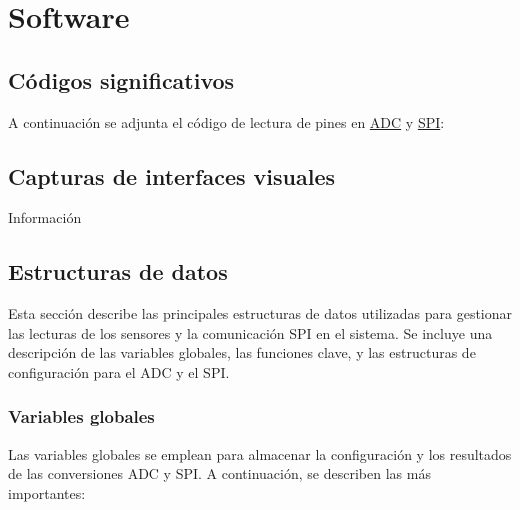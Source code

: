 \chapter{Software}

\section{Códigos significativos}
A continuación se adjunta el código de lectura de pines en \hyperref[adc_code]{ADC} y \hyperref[spi_code]{SPI}:




    
    \section{Capturas de interfaces visuales}
        Información
    
    \section{Estructuras de datos}

Esta sección describe las principales estructuras de datos utilizadas para gestionar las lecturas de los sensores y la comunicación SPI en el sistema. Se incluye una descripción de las variables globales, las funciones clave, y las estructuras de configuración para el ADC y el SPI.

\subsection{Variables globales}

Las variables globales se emplean para almacenar la configuración y los resultados de las conversiones ADC y SPI. A continuación, se describen las más importantes:

